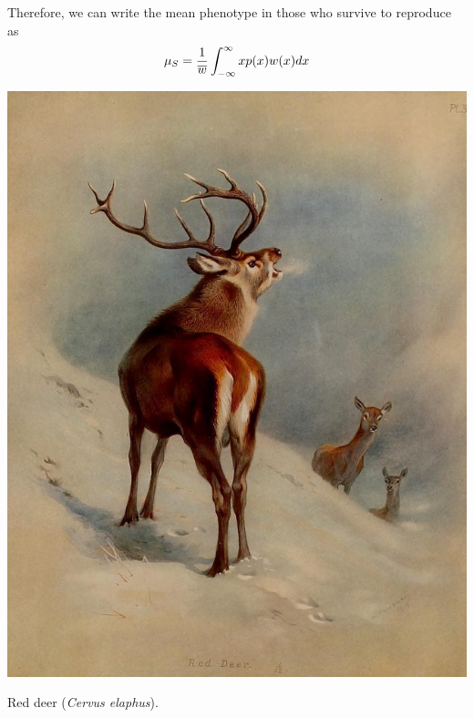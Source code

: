 Therefore, we can write the mean phenotype in those who survive to
reproduce as
\begin{equation}
\mu_S = \frac{1}{\overline{w}}\int_{-\infty}^{\infty} x p(x) w(x) dx
\end{equation}
\begin{marginfigure}
  \begin{center}
    \includegraphics[width= \textwidth]{illustration_images/Quant_gen/red_deer/Red_deer.png}
\end{center}
\caption{Red deer ({\it Cervus elaphus}). } \label{fig:red_deer}  
\end{marginfigure}

